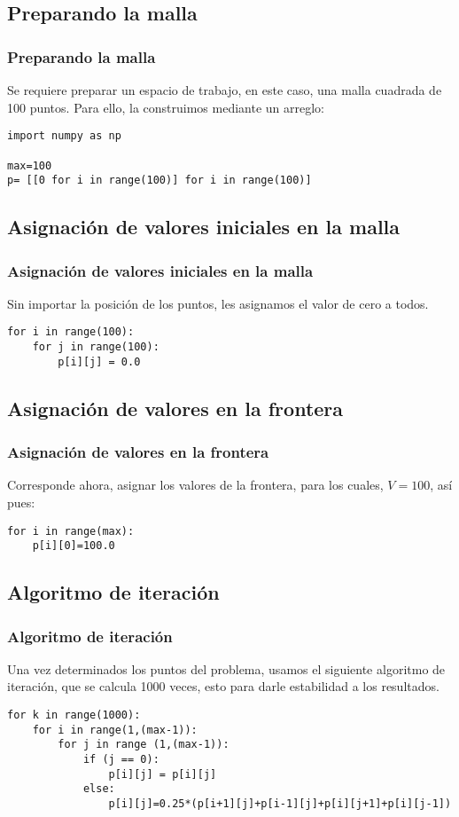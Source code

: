 \subsection{Preparando la malla}
\begin{frame}[fragile]
\frametitle{Preparando la malla}
Se requiere preparar un espacio de trabajo, en este caso, una malla cuadrada de 100 puntos. Para ello, la construimos mediante un arreglo:
\begin{lstlisting}
import numpy as np

max=100
p= [[0 for i in range(100)] for i in range(100)]
\end{lstlisting}
\end{frame}
\subsection{Asignación de valores iniciales en la malla}
\begin{frame}[fragile]
\frametitle{Asignación de valores iniciales en la malla}
Sin importar la posición de los puntos, les asignamos el valor de cero a todos.
\begin{lstlisting}
for i in range(100):
    for j in range(100):
        p[i][j] = 0.0
\end{lstlisting}
\end{frame}
\subsection{Asignación de valores en la frontera}
\begin{frame}[fragile]
\frametitle{Asignación de valores en la frontera}
Corresponde ahora, asignar los valores de la frontera, para los cuales, $V=100$, así pues:
\begin{lstlisting}
for i in range(max):
    p[i][0]=100.0
\end{lstlisting}
\end{frame}
\subsection{Algoritmo de iteración}
\begin{frame}[fragile]
\frametitle{Algoritmo de iteración}
Una vez determinados los puntos del problema, usamos el siguiente algoritmo de iteración, que se calcula 1000 veces, esto para darle estabilidad a los resultados.
\begin{lstlisting}
for k in range(1000):
    for i in range(1,(max-1)):
        for j in range (1,(max-1)):
            if (j == 0):
                p[i][j] = p[i][j]
            else:
                p[i][j]=0.25*(p[i+1][j]+p[i-1][j]+p[i][j+1]+p[i][j-1])
\end{lstlisting}
\end{frame}
